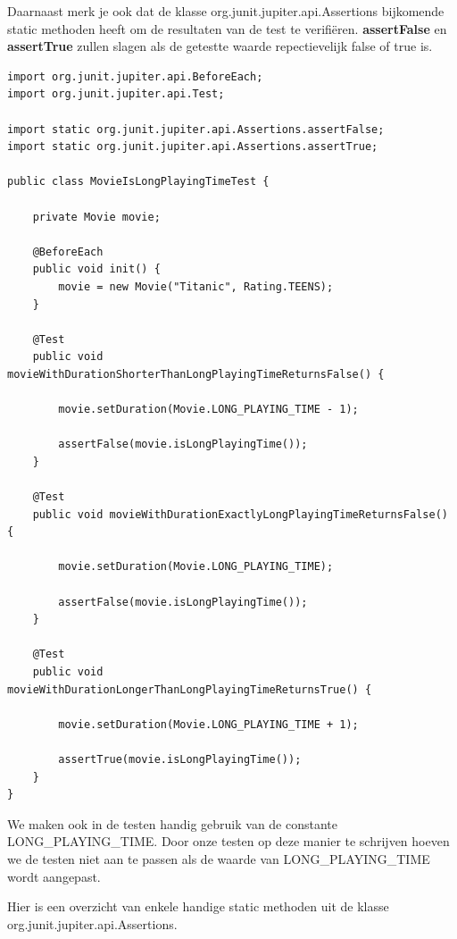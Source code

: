 Daarnaast merk je ook dat de klasse org.junit.jupiter.api.Assertions bijkomende static methoden heeft om de resultaten van de test te verifi\"eren. \textbf{assertFalse} en \textbf{assertTrue} zullen  slagen als de getestte waarde repectievelijk false of true is.

\begin{lstlisting}
import org.junit.jupiter.api.BeforeEach;
import org.junit.jupiter.api.Test;

import static org.junit.jupiter.api.Assertions.assertFalse;
import static org.junit.jupiter.api.Assertions.assertTrue;

public class MovieIsLongPlayingTimeTest {

	private Movie movie;

	@BeforeEach
	public void init() {
		movie = new Movie("Titanic", Rating.TEENS);
	}

	@Test
	public void movieWithDurationShorterThanLongPlayingTimeReturnsFalse() {

		movie.setDuration(Movie.LONG_PLAYING_TIME - 1);

		assertFalse(movie.isLongPlayingTime());
	}

	@Test
	public void movieWithDurationExactlyLongPlayingTimeReturnsFalse() {

		movie.setDuration(Movie.LONG_PLAYING_TIME);

		assertFalse(movie.isLongPlayingTime());
	}

	@Test
	public void movieWithDurationLongerThanLongPlayingTimeReturnsTrue() {

		movie.setDuration(Movie.LONG_PLAYING_TIME + 1);

		assertTrue(movie.isLongPlayingTime());
	}
}
\end{lstlisting}

We maken ook in de testen handig gebruik van de constante LONG\_PLAYING\_TIME. Door onze testen op deze manier te schrijven hoeven we de testen niet aan te passen als de waarde van LONG\_PLAYING\_TIME wordt aangepast. 

Hier is een overzicht van enkele handige static methoden uit de klasse org.junit.jupiter.api.Assertions. 

